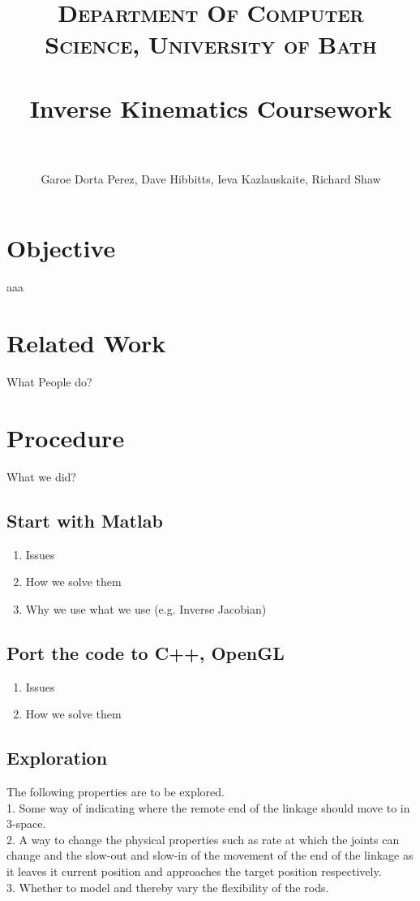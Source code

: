 \documentclass[paper=a4, fontsize=11pt]{scrartcl} %
\title{	
\normalfont \normalsize 
\textsc{Department Of Computer Science, University of Bath} \\ [2pt] %
\horrule{0.5pt} \\[0.2cm] %
\huge Inverse Kinematics Coursework \\ %
\horrule{0.5pt} \\[0.0cm] %
}
\author{Garoe Dorta Perez, Dave Hibbitts, Ieva Kazlauskaite, Richard Shaw} %
\numberwithin{equation}{section} %
\numberwithin{figure}{section} %
\numberwithin{table}{section} %
\begin{document}
\maketitle %

\section{Objective}
aaa


\section{Related Work}
What People do?


\section{Procedure}
What we did?

\subsection{Start with Matlab}
    \begin{enumerate}
    \item Issues
    \item How we solve them
    \item Why we use what we use (e.g. Inverse Jacobian)
  \end{enumerate}
\subsection{ Port the code to C++, OpenGL}
    \begin{enumerate}
    \item Issues
    \item How we solve them
  \end{enumerate}
  
\subsection{Exploration}
The following properties are to be explored.\\
1. Some way of indicating where the remote end of the linkage should move to in 3-space.\\
2. A way to change the physical properties such as rate at which the joints can change and the slow-out and slow-in of the movement of the end of the linkage as it leaves it current position and approaches the target position respectively.\\
3. Whether to model and thereby vary the flexibility of the rods.
\end{document}

